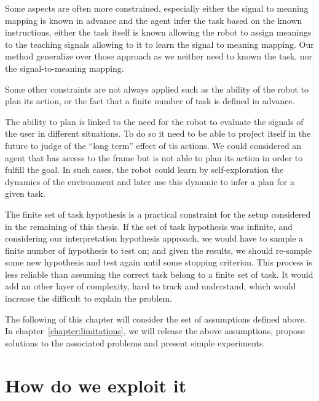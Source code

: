Some aspects are often more constrained, especially either the signal to meaning mapping is known in advance and the agent infer the task based on the known instructions, either the task itself is known allowing the robot to assign meanings to the teaching signals allowing to it to learn the signal to meaning mapping. Our method generalize over those approach as we neither need to known the task, nor the signal-to-meaning mapping.

Some other constraints are not always applied such as the ability of the robot to plan its action, or the fact that a finite number of task is defined in advance. 

The ability to plan is linked to the need for the robot to evaluate the signals of the user in different situations. To do so it need to be able to project itself in the future to judge of the ``long term'' effect of tis actions. We could considered an agent that has access to the frame but is not able to plan its action in order to fulfill the goal. In such cases, the robot could learn by self-exploration the dynamics of the environment and later use this dynamic to infer a plan for a given task.

The finite set of task hypothesis is a practical constraint for the setup considered in the remaining of this thesis. If the set of task hypothesis was infinite, and considering our interpretation hypothesis approach, we would have to sample a finite number of hypothesis to test on; and given the results, we should re-sample some new hypothesis and test again until some stopping criterion. This process is less reliable than assuming the correct task belong to a finite set of task. It would add an other layer of complexity, hard to track and understand, which would increase the difficult to explain the problem.

The following of this chapter will consider the set of assumptions defined above. In chapter~\ref{chapter:limitations}, we will release the above assumptions, propose solutions to the associated problems and present simple experiments.


\section{How do we exploit it}
\label{chapter:lfui:how}

